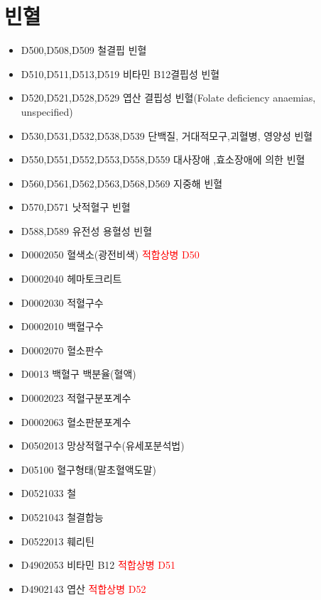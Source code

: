 \section{빈혈}
\myde{}
{
\begin{itemize}\tightlist
\item[\dsjuridical] D500,D508,D509  철결핍 빈혈
\item[\dsjuridical] D510,D511,D513,D519  비타민 B12결핍성 빈혈
\item[\dsjuridical] D520,D521,D528,D529  엽산 결핍성 빈혈(Folate deficiency anaemias, unspecified)
\item[\dsjuridical] D530,D531,D532,D538,D539 단백질, 거대적모구,괴혈병, 영양성 빈혈
\item[\dsjuridical] D550,D551,D552,D553,D558,D559  대사장애 ,효소장애에 의한 빈혈
\item[\dsjuridical] D560,D561,D562,D563,D568,D569  지중해 빈혈
\item[\dsjuridical] D570,D571  낫적혈구 빈혈
\item[\dsjuridical] D588,D589  유전성 용혈성 빈혈
\item[\dschemical] D0002050 혈색소(광전비색) \textcolor{red}{적합상병 D50}
\item[\dschemical] D0002040 헤마토크리트
\item[\dschemical] D0002030 적혈구수
\item[\dschemical] D0002010 백혈구수
\item[\dschemical] D0002070 혈소판수
\item[\dschemical] D0013 백혈구 백분율(혈액)
\item[\dschemical] D0002023 적혈구분포계수
\item[\dschemical] D0002063 혈소판분포계수
\item[\dschemical] D0502013 망상적혈구수(유세포분석법)
\item[\dschemical] D05100 혈구형태(말초혈액도말)
\item[\dschemical] D0521033 철
\item[\dschemical] D0521043 철결합능
\item[\dschemical] D0522013 훼리틴
\item[\dschemical] D4902053 비타민 B12 \textcolor{red}{적합상병 D51}
\item[\dschemical] D4902143 엽산 \textcolor{red}{적합상병 D52}
\end{itemize}
}
